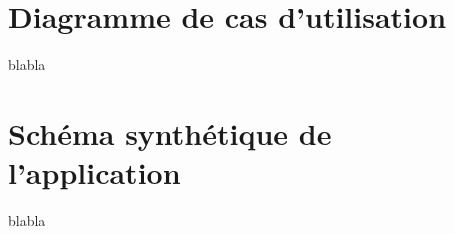 \documentclass[10pt]{report}
\begin{document}
\section{Diagramme de cas d'utilisation}
	\begin{figure}[hp]
	      \begin{center}
	      \end{center}
	\end{figure}
blabla

\newpage
\section{Schéma synthétique de l'application}
	\begin{figure}[hp]
	      \begin{center}
	      \end{center}
	\end{figure}
blabla
\end{document}
